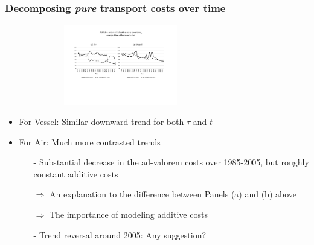 \documentclass[10 pt,Helvetica, french]{beamer}
\begin{document}
\begin{frame}
\frametitle{Decomposing \textit{pure} transport costs over time }
\begin{figure}[htbp]
\begin{center}
\includegraphics[width=8cm, height=3.5cm]{Fig3b_TCovertime_add_et_mult_3d.pdf}
\end{center}
\end{figure}
\begin{itemize}
\item For Vessel: Similar downward trend for both $\tau$ and $t$  \vspace{0.1cm}
\item For Air: Much more contrasted trends  \vspace{0.1cm}
\begin{itemize}
\item[-] Substantial decrease in the ad-valorem costs over 1985-2005, but roughly constant additive costs  \vspace{0.1cm}
\item[$\Rightarrow$] An explanation to the difference between Panels (a) and (b) above  \vspace{0.1cm}

\item[$\Rightarrow$] The importance of modeling additive costs  \vspace{0.1cm}
\item[-] Trend reversal around 2005: Any suggestion?
\end{itemize}
\end{itemize}
\end{frame}
\end{document}
